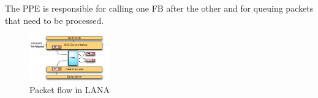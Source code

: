 \documentclass{sig-alternate}
\begin{document}
The PPE is responsible for calling one FB after the other and for queuing packets that need to be processed.



\begin{figure}
\centering
\includegraphics[width=0.31\textwidth]{figures/data_flow.pdf}
\vspace{-0.1cm}
\caption{Packet flow in LANA}
\label{fig:architecture}
\vspace{-0.2cm}
\end{figure}
\end{document}
